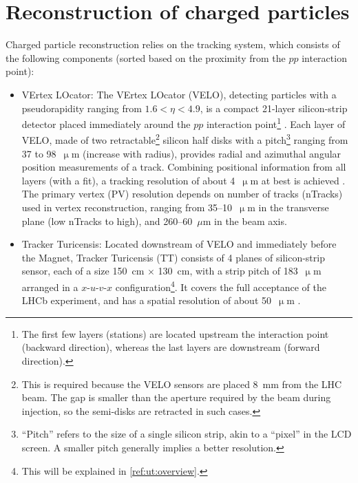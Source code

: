 \section{Reconstruction of charged particles}
\label{ref:detector:tracking}

Charged particle reconstruction relies on the tracking system,
which consists of the following components
(sorted based on the proximity from the $pp$ interaction point):

\begin{itemize}
    \item VErtex LOcator:
        The VErtex LOcator (VELO),
        detecting particles with a pseudorapidity ranging from
        $1.6 < \eta < 4.9$,
        is a compact 21-layer silicon-strip detector placed immediately
        around the $pp$ interaction point\footnote{
            The first few layers (stations) are located upstream the interaction
            point (backward direction),
            whereas the last layers are downstream (forward direction).
        }
        \cite{The_LHCb_Collaboration_2008}.
        Each layer of VELO,
        made of two retractable\footnote{
            This is required because the VELO sensors are placed 8~mm from the
            LHC beam.
            The gap is smaller than the aperture required by the beam during
            injection,
            so the semi-disks are retracted in such cases.
        } silicon half disks with a pitch\footnote{
            ``Pitch'' refers to the size of a single silicon strip, akin to a
            ``pixel'' in the LCD screen.
            A smaller pitch generally implies a better resolution.
        } ranging from 37 to 98~$\upmu$m (increase with radius),
        provides radial and azimuthal angular position measurements of a track.
        Combining positional information from all layers (with a fit),
        a tracking resolution of about 4~$\upmu$m at best is achieved
        \cite{Aaij_2014}.
        The primary vertex (PV) resolution depends on number of tracks (nTracks)
        used in vertex reconstruction,
        ranging from 35--10~$\upmu$m in the transverse plane
        (low nTracks to high),
        and 260--60~$\mu$m in the beam axis.

    \item Tracker Turicensis:
        Located downstream of VELO and immediately before the Magnet,
        Tracker Turicensis (TT) consists of 4 planes of silicon-strip sensor,
        each of a size 150~cm $\times$ 130~cm,
        with a strip pitch of 183~$\upmu$m arranged in a $x$-$u$-$v$-$x$
        configuration\footnote{
            This will be explained in \cref{ref:ut:overview}.
        }.
        It covers the full acceptance of the LHCb experiment, and has a spatial
        resolution of about 50~$\upmu$m
        \cite{The_LHCb_Collaboration_2008}.


\end{itemize}
